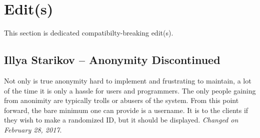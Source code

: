 \documentclass[oneside,12pt]{scrbook}
\begin{document}
\chapter{Edit(s)}
This section is dedicated compatibilty-breaking edit(s).

\section*{Illya Starikov -- Anonymity Discontinued}
Not only is true anonymity hard to implement and frustrating to maintain, a lot of the time it is only a hassle for users and programmers. The only people gaining from anonimity are typically trolls or abusers of the system. From this point forward, the bare minimum one can provide is a username. It is to the clients if they wish to make a randomized ID, but it should be displayed. \textit{Changed on February 28, 2017}.
\end{document}
